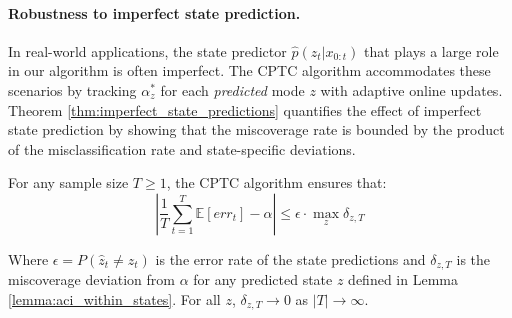 
\vspace{-0.5em}
\paragraph{Robustness to imperfect state prediction.}
In real-world applications, the state predictor  $\hat{p}(z_t|x_{0:t})$ that plays a large role in our algorithm is often imperfect. The CPTC algorithm accommodates these scenarios by tracking $\alpha^*_{z}$ for each \textit{predicted} mode $z$ with adaptive online updates. Theorem \ref{thm:imperfect_state_predictions} quantifies the effect of imperfect state prediction by showing that the miscoverage rate is bounded by the product of the misclassification rate and state-specific deviations. 
%
\vspace{0.1em}
\begin{theorem}\label{thm:imperfect_state_predictions}
For any sample size \( T \geq 1 \), the CPTC algorithm ensures that:
\vspace{-0.2em}
\[
\left| \frac{1}{T} \sum_{t=1}^{T} \mathbb{E}[err_t]  - \alpha \right| \leq \epsilon \cdot \max_z \delta_{z,T}
\]

\vspace{-1em}
Where \( \epsilon = P(\hat{z}_t \neq z_t) \) is the error rate of the state predictions and \( \delta_{z,T} \) is the miscoverage deviation from \( \alpha \) for any predicted state $z$ defined in Lemma \ref{lemma:aci_within_states}. For all $z$, \( \delta_{z,T} \to 0 \) as \( |T| \to \infty \).
\end{theorem}

